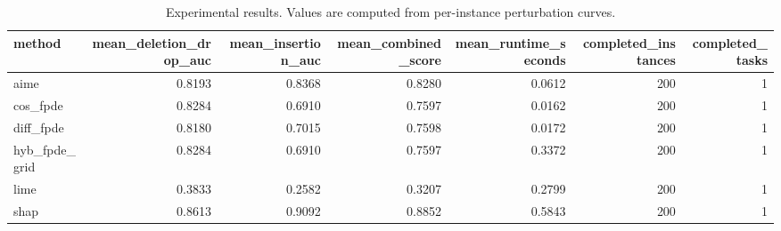 \begin{table}[t]
\caption{Experimental results. Values are computed from per-instance perturbation curves.}
\label{tab:main_results_computed}
\centering
\begin{tabular}{lrrrrrr}
\toprule
method & mean\_deletion\_drop\_auc & mean\_insertion\_auc & mean\_combined\_score & mean\_runtime\_seconds & completed\_instances & completed\_tasks \\
\midrule
aime & 0.8193 & 0.8368 & 0.8280 & 0.0612 & 200 & 1 \\
cos\_fpde & 0.8284 & 0.6910 & 0.7597 & 0.0162 & 200 & 1 \\
diff\_fpde & 0.8180 & 0.7015 & 0.7598 & 0.0172 & 200 & 1 \\
hyb\_fpde\_grid & 0.8284 & 0.6910 & 0.7597 & 0.3372 & 200 & 1 \\
lime & 0.3833 & 0.2582 & 0.3207 & 0.2799 & 200 & 1 \\
shap & 0.8613 & 0.9092 & 0.8852 & 0.5843 & 200 & 1 \\
\bottomrule
\end{tabular}

\end{table}
